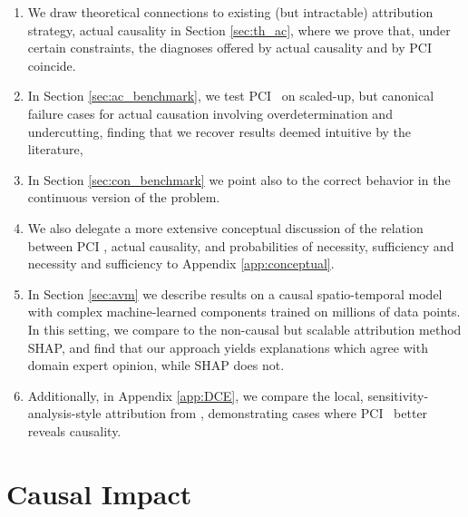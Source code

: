 \documentclass[anon,12pt]{clear2026} %
\newcommand{\ourapproach}{PCI }
\begin{document}
\begin{enumerate}[itemsep=0pt, topsep=0pt, parsep=0pt]
    \item  We draw theoretical connections to existing (but intractable) attribution strategy, actual causality in Section \ref{sec:th_ac}, where we prove that, under certain constraints, the diagnoses offered by actual causality and by \ourapproach coincide. 
    
    \item In Section \ref{sec:ac_benchmark}, we test \ourapproach\ on scaled-up, but canonical failure cases for actual causation involving overdetermination and undercutting, finding that we recover results deemed intuitive by the literature, 
    
    \item In Section \ref{sec:con_benchmark}  we  point also to the correct behavior in the continuous version of the problem.

\item  We also delegate a more extensive conceptual discussion of the relation between \ourapproach, actual causality, and probabilities of necessity, sufficiency and necessity and sufficiency to Appendix \ref{app:conceptual}.

\item In Section \ref{sec:avm} we describe results on a causal spatio-temporal model with complex machine-learned components trained on millions of data points. In this setting, we compare to the non-causal but scalable attribution method SHAP, and find that our approach yields explanations which agree with domain expert opinion, while SHAP does not.


\item Additionally, in Appendix \ref{app:DCE}, we  compare the local, sensitivity-analysis-style attribution from  \cite{butler2022differential}, demonstrating cases where \ourapproach\ better reveals causality.


\end{enumerate}

\section{Causal Impact}\label{sec:causal_impact}
\end{document}
